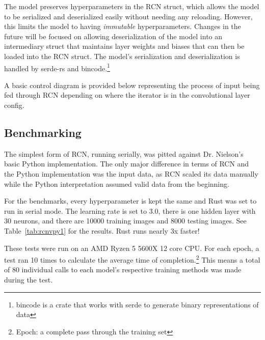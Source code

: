 \begin{multicols}{2}
The model preserves hyperparameters in the RCN struct, which allows the model to be serialized and deserialized
easily without needing any reloading. However, this limits the model to having \textit{immutable}
hyperparameters. Changes in the future will be focused on allowing deserialization of the model into an intermediary struct
that maintains layer weights and biases that can then be loaded into the RCN struct. The model's serialization and
deserialization is handled by serde-rs and bincode.\footnote{bincode is a crate that works with serde to generate binary
representations of data}

A basic control diagram is provided below representing the process of input being fed through RCN depending on where
the iterator is in the convolutional layer config.



\subsection{Benchmarking}
The simplest form of RCN, running serially, was pitted against Dr. Nielson's basic Python implementation. The only major
difference in terms of RCN and the Python implementation was the input data, as RCN scaled its data manually while the Python
interpretation assumed valid data from the beginning.

For the benchmarks, every hyperparameter is kept the same and Rust was set to run in serial mode. The learning rate is
set to 3.0, there is one hidden layer with 30 neurons, and there are 10000 training images and 8000 testing images.
See Table~\ref{tab:rcnvpy1} for the results. Rust runs nearly 3x faster!

These tests were run on an AMD Ryzen 5 5600X 12 core CPU. For each epoch, a test ran 10 times to calculate the average
time of completion.\footnote{Epoch: a complete pass through the training set} This means a total of 80 individual calls
to each model's respective training methods was made during the test.

\end{multicols}

